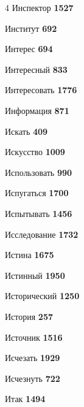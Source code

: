 \begin{multicols}{4}
\noindent Инспектор \dotfill \textbf{\color{secondary} 1527}\par
\noindent Институт \dotfill \textbf{\color{secondary} 692}\par
\noindent Интерес \dotfill \textbf{\color{secondary} 694}\par
\noindent Интересный \dotfill \textbf{\color{secondary} 833}\par
\noindent Интересовать \dotfill \textbf{\color{secondary} 1776}\par
\noindent Информация \dotfill \textbf{\color{secondary} 871}\par
\noindent Искать \dotfill \textbf{\color{secondary} 409}\par
\noindent Искусство \dotfill \textbf{\color{secondary} 1009}\par
\noindent Использовать \dotfill \textbf{\color{secondary} 990}\par
\noindent Испугаться \dotfill \textbf{\color{secondary} 1700}\par
\noindent Испытывать \dotfill \textbf{\color{secondary} 1456}\par
\noindent Исследование \dotfill \textbf{\color{secondary} 1732}\par
\noindent Истина \dotfill \textbf{\color{secondary} 1675}\par
\noindent Истинный \dotfill \textbf{\color{secondary} 1950}\par
\noindent Исторический \dotfill \textbf{\color{secondary} 1250}\par
\noindent История \dotfill \textbf{\color{secondary} 257}\par
\noindent Источник \dotfill \textbf{\color{secondary} 1516}\par
\noindent Исчезать \dotfill \textbf{\color{secondary} 1929}\par
\noindent Исчезнуть \dotfill \textbf{\color{secondary} 722}\par
\noindent Итак \dotfill \textbf{\color{secondary} 1494}\par


\end{multicols}
